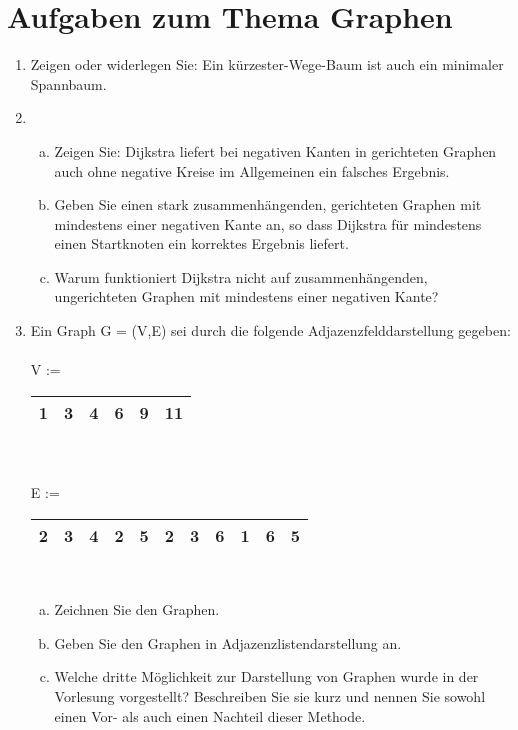 \documentclass{scrartcl}
\begin{document}
\section*{Aufgaben zum Thema Graphen}
\begin{enumerate}[(1)]

\item Zeigen oder widerlegen Sie: Ein k\"urzester-Wege-Baum ist auch ein minimaler Spannbaum.

\item \begin{enumerate}[(a)]
\item Zeigen Sie: Dijkstra liefert bei negativen Kanten in gerichteten Graphen auch ohne negative Kreise im Allgemeinen ein falsches Ergebnis.
\item Geben Sie einen stark zusammenh\"angenden, gerichteten Graphen mit mindestens einer negativen Kante an, so dass Dijkstra f\"ur mindestens einen Startknoten ein korrektes Ergebnis liefert.
\item Warum funktioniert Dijkstra nicht auf zusammenh\"angenden, ungerichteten Graphen mit mindestens einer negativen Kante?
\end{enumerate}

\item Ein Graph G = (V,E) sei durch die folgende Adjazenzfelddarstellung gegeben:\\
\ \\
V := \begin{tabular}{|c|c|c|c|c|c|}
\hline 
1 & 3 & 4 & 6 & 9 & 11 \\ 
\hline 
\end{tabular}  \\
\ \\
E := \begin{tabular}{|c|c|c|c|c|c|c|c|c|c|c|}
\hline 
2 & 3 & 4 & 2 & 5 & 2 & 3 & 6 & 1 & 6 & 5 \\ 
\hline 
\end{tabular}\\
\begin{enumerate}[(a)]
	\item Zeichnen Sie den Graphen.
	\item Geben Sie den Graphen in Adjazenzlistendarstellung an.
	\item Welche dritte Möglichkeit zur Darstellung von Graphen wurde in der Vorlesung vorgestellt? Beschreiben Sie sie kurz und nennen Sie sowohl einen Vor- als auch einen Nachteil dieser Methode.
\end{enumerate} 
\end{enumerate}
\end{document}
